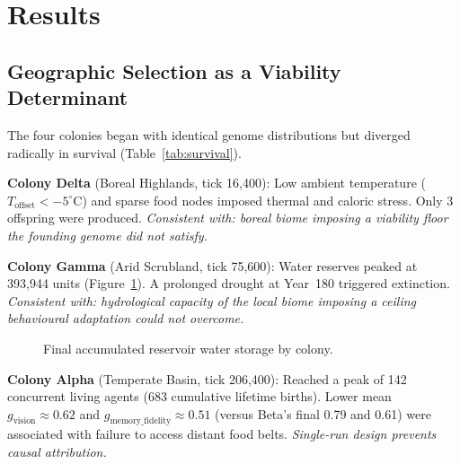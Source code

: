 \documentclass[12pt,a4paper]{article}
\begin{document}
\section{Results}

\subsection{Geographic Selection as a Viability Determinant}

The four colonies began with identical genome distributions but diverged radically in survival (Table~\ref{tab:survival}).

\textbf{Colony Delta} (Boreal Highlands, tick 16,400): Low ambient temperature ($T_{\text{offset}} < -5^{\circ}$C) and sparse food nodes imposed thermal and caloric stress. Only 3 offspring were produced. \textit{Consistent with: boreal biome imposing a viability floor the founding genome did not satisfy.}

\textbf{Colony Gamma} (Arid Scrubland, tick 75,600): Water reserves peaked at 393,944 units (Figure~\ref{fig:water_storage}). A prolonged drought at Year~180 triggered extinction. \textit{Consistent with: hydrological capacity of the local biome imposing a ceiling behavioural adaptation could not overcome.}

\begin{figure}[ht]
\centering
{}
\caption{Final accumulated reservoir water storage by colony.}
\label{fig:water_storage}
\end{figure}

\textbf{Colony Alpha} (Temperate Basin, tick 206,400): Reached a peak of 142 concurrent living agents (683 cumulative lifetime births). Lower mean $g_{\text{vision}} \approx 0.62$ and $g_{\text{memory\_fidelity}} \approx 0.51$ (versus Beta's final 0.79 and 0.61) were associated with failure to access distant food belts. \textit{Single-run design prevents causal attribution.}
\end{document}
